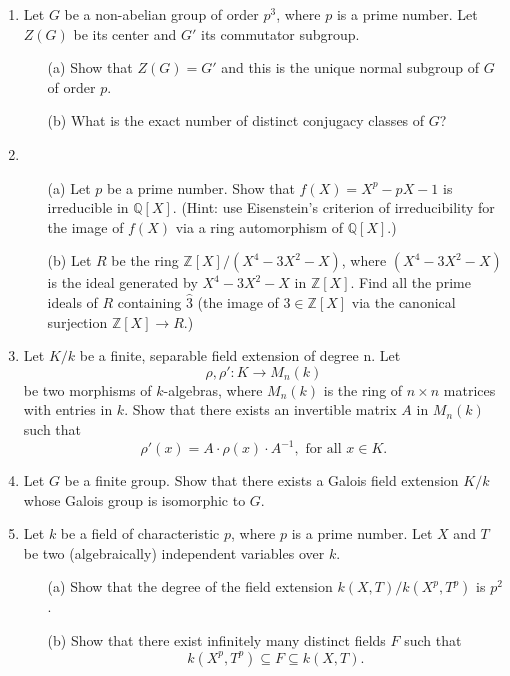 \documentclass{article}
\begin{document}
\begin{enumerate}
    \item Let \(G\) be a non-abelian group of order \(p^3\), where \(p\) is a prime number. Let \(Z(G)\) be its center and \(G'\) its commutator subgroup.
    \begin{itemize}
        \item[(a)] Show that \(Z(G)=G'\) and this is the unique normal subgroup of \(G\) of order \(p\).
        \item[(b)] What is the exact number of distinct conjugacy classes of \(G\)?
    \end{itemize}

    \item 
    \begin{itemize}
        \item[(a)] Let \(p\) be a prime number. Show that \(f(X)=X^p-pX-1\) is irreducible in \(\mathbb{Q}[X]\). (Hint: use Eisenstein's criterion of irreducibility for the image of \(f(X)\) via a ring automorphism of \(\mathbb{Q}[X]\).)
        \item[(b)] Let \(R\) be the ring \(\mathbb{Z}[X]/(X^4-3X^2-X)\), where \((X^4-3X^2-X)\) is the ideal generated by \(X^4-3X^2-X\) in \(\mathbb{Z}[X]\). Find all the prime ideals of \(R\) containing \(\hat{3}\) (the image of \(3 \in \mathbb{Z}[X]\) via the canonical surjection \(\mathbb{Z}[X] \to R\).)
    \end{itemize}

    \item Let \(K/k\) be a finite, separable field extension of degree n. Let
    \[\rho, \rho' : K \to M_n(k)\]
    be two morphisms of \(k\)-algebras, where \(M_n(k)\) is the ring of \(n \times n\) matrices with entries in \(k\). Show that there exists an invertible matrix \(A\) in \(M_n(k)\) such that
    \[\rho'(x)=A \cdot \rho(x) \cdot A^{-1}, \text{ for all } x \in K.\]

    \item Let \(G\) be a finite group. Show that there exists a Galois field extension \(K/k\) whose Galois group is isomorphic to \(G\).

    \item Let \(k\) be a field of characteristic \(p\), where \(p\) is a prime number. Let \(X\) and \(T\) be two (algebraically) independent variables over \(k\).
    \begin{itemize}
        \item[(a)] Show that the degree of the field extension \(k(X,T)/k(X^p,T^p)\) is \(p^2\).
        \item[(b)] Show that there exist infinitely many distinct fields \(F\) such that
        \[k(X^p,T^p) \subseteq F \subseteq k(X,T).\]
    \end{itemize}


\end{enumerate}
\end{document}
